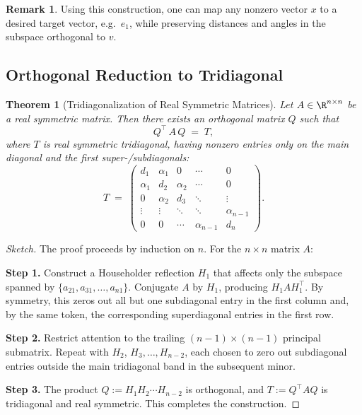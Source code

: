 \documentclass[letterpaper,11pt,oneside,reqno]{article}
\numberwithin{equation}{section}
\newtheorem{theorem}[proposition]{Theorem}
\theoremstyle{definition}
\newtheorem{remark}[proposition]{Remark}
\begin{document}
\begin{remark}
Using this construction, one can map any nonzero vector $x$ to a desired target vector, e.g.\ $e_1$, while preserving distances and angles in the subspace orthogonal to $v$.
\end{remark}

\subsection{Orthogonal Reduction to Tridiagonal}

\begin{theorem}[Tridiagonalization of Real Symmetric Matrices]
\label{thm:tridiagonal}
Let $A\in \R^{n\times n}$ be a real symmetric matrix. Then there exists an orthogonal matrix $Q$ such that
\[
  Q^\top\,A\,Q \;=\; T,
\]
where $T$ is real symmetric \emph{tridiagonal}, having nonzero entries only on the main diagonal and the first super-/subdiagonals:
\[
  T \;=\;
  \begin{pmatrix}
     d_1 & \alpha_1 & 0 & \cdots & 0\\
     \alpha_1 & d_2 & \alpha_2 & \cdots & 0\\
     0 & \alpha_2 & d_3 & \ddots & \vdots\\
     \vdots & \vdots & \ddots & \ddots & \alpha_{n-1}\\
     0 & 0 & \cdots & \alpha_{n-1} & d_n
  \end{pmatrix}.
\]
\end{theorem}

\begin{proof}[Sketch]
The proof proceeds by induction on $n$. For the $n\times n$ matrix $A$:

\noindent
{\bf Step 1.} Construct a Householder reflection $H_1$ that affects only the subspace spanned by $\{a_{21},a_{31},\dots,a_{n1}\}$. Conjugate $A$ by $H_1$, producing $H_1 A H_1^\top$. By symmetry, this zeros out all but one subdiagonal entry in the first column and, by the same token, the corresponding superdiagonal entries in the first row.

\noindent
{\bf Step 2.} Restrict attention to the trailing $(n-1)\times(n-1)$ principal submatrix. Repeat with $H_2$, $H_3,\dots,H_{n-2}$, each chosen to zero out subdiagonal entries outside the main tridiagonal band in the subsequent minor.

\noindent
{\bf Step 3.} The product $Q := H_1 H_2 \cdots H_{n-2}$ is orthogonal, and $T := Q^\top A Q$ is tridiagonal and real symmetric. This completes the construction.
\end{proof}
\end{document}
